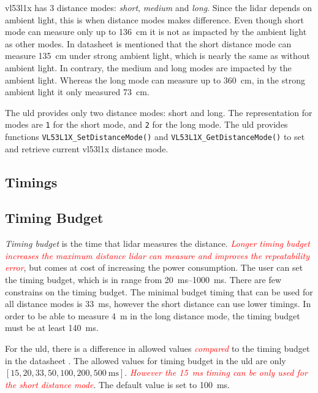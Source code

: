 \documentclass[
  digital,     %
  oneside,     %
  nosansbold,  %
  nocolorbold, %
  lof,         %
  lot,         %
]{fithesis4}
\newcommand{\TODO}[1]{\textcolor{red}{\textit{#1}}}
\begin{document}
{{{\gls{vl53l1x} has 3 distance modes: \emph{short}, \emph{medium} and \emph{long}. Since the \acrshort{lidar} depends on ambient light, this is when distance modes makes difference. Even though short mode can measure only up to \qty{136}{\centi\metre} it is not as impacted by the ambient light as other modes. In datasheet \cite{vl53l1x} is mentioned that the short distance mode can measure \qty{135}{\centi\metre} under strong ambient light, which is nearly the same as without ambient light. In contrary, the medium and long modes are impacted by the ambient light. Whereas the long mode can measure up to \qty{360}{\centi\metre}, in the strong ambient light it only measured \qty{73}{\centi\metre}.

The \acrshort{uld} provides only two distance modes: short and long. The representation for modes are \lstinline|1| for the short mode, and \lstinline|2| for the long mode. The \acrshort{uld} provides functions \lstinline|VL53L1X_SetDistanceMode()| and \lstinline|VL53L1X_GetDistanceMode()| to set and retrieve current \gls{vl53l1x} distance mode.

\subsection{ Timings }


\subsection{ Timing Budget } \label{TB}

\emph{Timing budget} is the time that \acrshort{lidar} measures the distance. \TODO{ Longer timing budget increases the maximum distance \acrshort{lidar} can measure and improves the repeatability error}, but comes at cost of increasing the power consumption. The user can set the timing budget, which is in range from \qtyrange{20}{1000}{\milli\second}. There are few constrains on the timing budget. The minimal budget timing that can be used for all distance modes is \qty{33}{\milli\second}, however the short distance can use lower timings. In order to be able to measure \qty{4}{\metre} in the long distance mode, the timing budget must be at least \qty{140}{\milli\second}.

For the \acrshort{uld}, there is a difference in allowed values \TODO{compared} to the timing budget in the datasheet \cite{vl53l1x}. The allowed values for timing budget in the \acrshort{uld} are only $[15, 20,
33, 50, 100, 200, \qty{500}{\milli\second}]$. \TODO{However the \qty{15}{\milli\second} timing can be only used for the short distance mode}. The default value is set to \qty{100}{\milli\second}.

}}}
\end{document}
